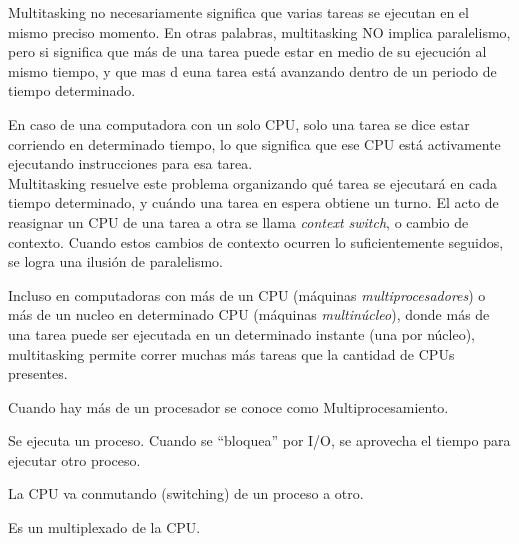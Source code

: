 \documentclass[a4paper, twoside]{article}
\begin{document}
Multitasking no necesariamente significa que varias tareas se ejecutan en el mismo preciso momento. En otras palabras, multitasking NO implica paralelismo, pero si significa que más de una tarea puede estar en medio de su ejecución al mismo tiempo, y que mas d euna tarea está avanzando dentro de un periodo de tiempo determinado.

En caso de una computadora con un solo CPU, solo una tarea se dice estar corriendo en determinado tiempo, lo que significa que ese CPU está activamente ejecutando instrucciones para esa tarea.\\
Multitasking resuelve este problema organizando qué tarea se ejecutará en cada tiempo determinado, y cuándo una tarea en espera obtiene un turno. El acto de reasignar un CPU de una tarea a otra se llama \emph{context switch}, o cambio de contexto. Cuando estos cambios de contexto ocurren lo suficientemente seguidos, se logra una ilusión de paralelismo.

Incluso en computadoras con más de un CPU (máquinas \emph{multiprocesadores}) o más de un nucleo en determinado CPU (máquinas \emph{multinúcleo}), donde más de una tarea puede ser ejecutada en un determinado instante (una por núcleo), multitasking permite correr muchas más tareas que la cantidad de CPUs presentes.

Cuando hay más de un procesador se conoce como Multiprocesamiento.

Se ejecuta un proceso. Cuando se “bloquea” por I/O, se aprovecha el tiempo para ejecutar otro proceso.

La CPU va conmutando (switching) de un proceso a otro.

Es un multiplexado de la CPU.
\end{document}
